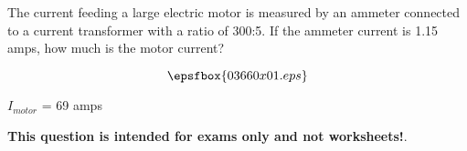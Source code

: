 

The current feeding a large electric motor is measured by an ammeter connected to a current transformer with a ratio of 300:5.  If the ammeter current is 1.15 amps, how much is the motor current?

$$\epsfbox{03660x01.eps}$$







$I_{motor}$ = 69 amps







{\bf This question is intended for exams only and not worksheets!}.




